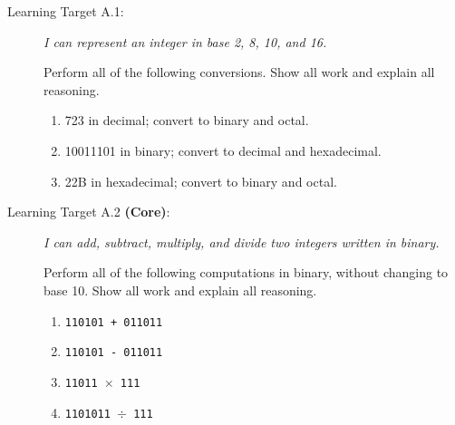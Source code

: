\documentclass[11 pt]{article}
\begin{document}
\begin{description}
\item[Learning Target A.1:] \emph{I can represent an integer in base 2, 8, 10, and 16.}

Perform all of the following conversions. Show all work and explain all reasoning. 

\begin{enumerate}
    \item 723 in decimal; convert to binary and octal. 
    \item 10011101 in binary; convert to decimal and hexadecimal. 
    \item 22B in hexadecimal; convert to binary and octal. 
\end{enumerate}

\vspace{0.2in}
\hline

\item[Learning Target A.2 \textbf{(Core)}:] \emph{I can add, subtract, multiply, and divide two integers written in binary.}

Perform all of the following computations in binary, without changing to base 10. Show all work and explain all reasoning. 

\begin{enumerate}
    \item \texttt{110101 + 011011} 
    \item \texttt{110101 - 011011} 
    \item \texttt{11011 $\times$ 111}
    \item \texttt{1101011 $\div$ 111}
\end{enumerate}

\end{description}
\end{document}
